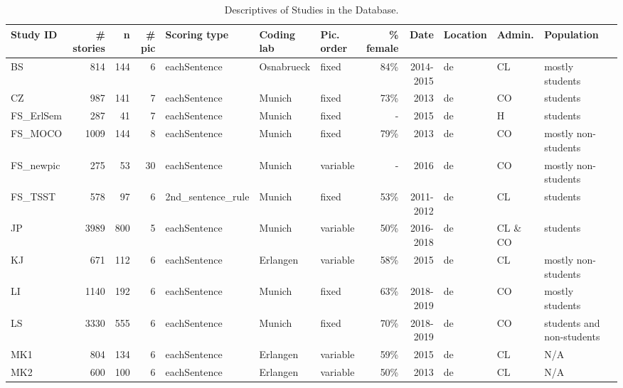 \documentclass[man,a4paper,mask]{apa6}\usepackage[]{graphicx}\usepackage[]{color}
\begin{document}
\begin{table}
\begin{threeparttable}
\begin{tabularx}{\textwidth}{llXX}
		\bottomrule
		\end{tabularx}
\end{threeparttable}
\end{table}







\begin{table}
\begin{threeparttable}
		\caption{Descriptives of Studies in the Database.}
		\label{tab:studies}
		\scriptsize
		\begin{tabularx}{\textwidth}{lrrrlllrrllll}
		\toprule


Study ID & \# stories & n & \# pic & Scoring type & Coding lab & Pic. order & \% female & Date & Location & Admin. & Population \\ 
  \hline
BS & 814 & 144 &   6 & eachSentence & Osnabrueck & fixed & 84\% & 2014-2015 & de & CL & mostly students \\ 
  CZ & 987 & 141 &   7 & eachSentence & Munich & fixed & 73\% & 2013 & de & CO & students \\ 
  FS\_ErlSem & 287 &  41 &   7 & eachSentence & Munich & fixed & - & 2015 & de & H & students \\ 
  FS\_MOCO & 1009 & 144 &   8 & eachSentence & Munich & fixed & 79\% & 2013 & de & CO & mostly non-students \\ 
  FS\_newpic & 275 &  53 &  30 & eachSentence & Munich & variable & - & 2016 & de & CO & mostly non-students \\ 
  FS\_TSST & 578 &  97 &   6 & 2nd\_sentence\_rule & Munich & fixed & 53\% & 2011-2012 & de & CL & students \\ 
  JP & 3989 & 800 &   5 & eachSentence & Munich & variable & 50\% & 2016-2018 & de & CL \& CO & students \\ 
  KJ & 671 & 112 &   6 & eachSentence & Erlangen & variable & 58\% & 2015 & de & CL & mostly non-students \\ 
  LI & 1140 & 192 &   6 & eachSentence & Munich & fixed & 63\% & 2018-2019 & de & CO & mostly students \\ 
  LS & 3330 & 555 &   6 & eachSentence & Munich & fixed & 70\% & 2018-2019 & de & CO & students and non-students \\ 
  MK1 & 804 & 134 &   6 & eachSentence & Erlangen & variable & 59\% & 2015 & de & CL & N/A \\ 
  MK2 & 600 & 100 &   6 & eachSentence & Erlangen & variable & 50\% & 2013 & de & CL & N/A \\ 

\end{tabularx}
\end{threeparttable}
\end{table}
\end{document}
